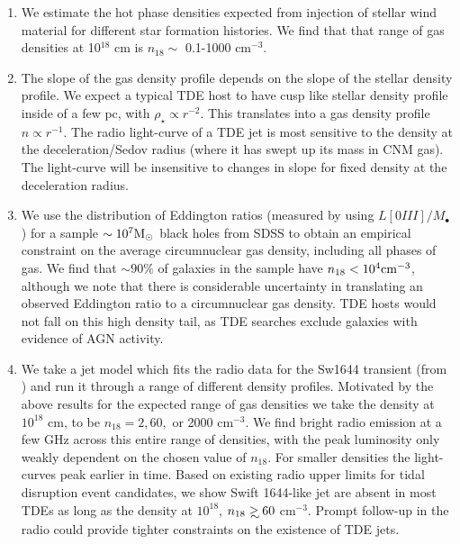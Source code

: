 \documentclass[usenatbib,fleqn]{mnras}
\newcommand\gsim{\mathrel{\rlap{\lower4pt\hbox{\hskip1pt$\sim$}}
    \raise1pt\hbox{$>$}}}
\newcommand{\Mbh}[1][]{M_{\bullet#1}}
\newcommand{\Msun}{{\rm M_\odot}}
\begin{document}
\begin{enumerate}
\item We estimate the hot phase densities expected from injection of
  stellar wind material for different star formation histories. We
  find that that range of gas densities at 10$^{18}$ cm is $n_{18}
  \sim$ 0.1-1000 cm$^{-3}$.

\item The slope of the gas density profile depends on the slope of the
  stellar density profile. We expect a typical TDE host to have cusp
  like stellar density profile inside of a few pc, with $\rho_\star
  \propto r^{-2}$. This translates into a gas density profile $n
  \propto r^{-1}$. The radio light-curve of a TDE jet is most
  sensitive to the density at the deceleration/Sedov radius (where it
  has swept up its mass in CNM gas). The light-curve will be
  insensitive to changes in slope for fixed density at the
  deceleration radius.

\item We use the distribution of Eddington ratios (measured by
  \citealt{Kauffmann+2009} using $L[0III]/\Mbh$) for a sample $\sim
  10^{7} \Msun$ black holes from SDSS to obtain an empirical
  constraint on the average circumnuclear gas density, including all
  phases of gas. We find that $\sim90\%$ of galaxies in the sample
  have $n_{18}<10^{4} {\rm cm}^{-3}$, although we note that there is
  considerable uncertainty in translating an observed Eddington ratio
  to a circumnuclear gas density. TDE hosts would not fall on this
  high density tail, as TDE searches exclude galaxies with evidence of
  AGN activity. 

\item We take a jet model which fits the radio data for the Sw1644
  transient (from \citealt{Mimica+2015}) and run it through a range of
  different density profiles. Motivated by the above results for the
  expected range of gas densities we take the density at $10^{18}$ cm,
  to be $n_{18}=2, 60,$ or 2000 cm$^{-3}$. We find bright radio
  emission at a few GHz across this entire range of densities, with
  the peak luminosity only weakly dependent on the chosen value of
  $n_{18}$.  For smaller densities the light-curves peak earlier in
  time. Based on existing radio upper limits for tidal disruption
  event candidates, we show Swift 1644-like jet are absent in most TDEs
  as long as the density at $10^{18}$, $n_{18} \gsim  60$
  cm$^{-3}$. Prompt follow-up in the radio could provide tighter
  constraints on the existence of TDE jets.  
\end{enumerate}
\end{document}
